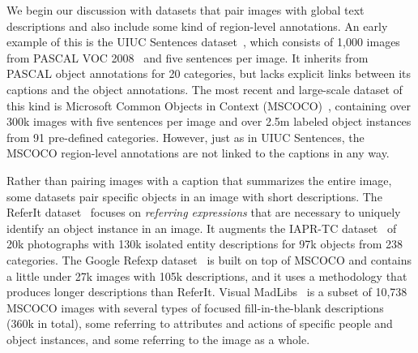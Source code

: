 \documentclass[twocolumn]{svjour3}
\begin{document}
We begin our discussion with datasets that pair images with global text descriptions and also include some kind of region-level annotations. An early example of this is the UIUC Sentences dataset~\citep{rashtchian2010collecting}, which consists of 1,000 images from PASCAL VOC 2008~\citep{pascal-voc-2008} and five sentences per image. It inherits from PASCAL object annotations for 20 categories, but lacks explicit links between its captions and the object annotations. The most recent and large-scale dataset of this kind is Microsoft Common Objects in Context (MSCOCO)~\citep{lin2014microsoft}, containing over 300k images with five sentences per image and over 2.5m labeled object instances from 91 pre-defined categories. However, just as in UIUC Sentences, the MSCOCO region-level annotations are not linked to the captions in any way.

Rather than pairing images with a caption that summarizes the entire image, some datasets pair specific objects in an image with short descriptions. The ReferIt dataset~\citep{kazemzadeh-EtAl:2014:EMNLP2014} focuses on {\em referring expressions} that are necessary to uniquely identify an object instance in an image. It augments the IAPR-TC dataset~\citep{grubinger2006iapr} of 20k photographs  with 130k isolated entity descriptions for 97k objects from 238 categories. The Google Refexp dataset~\citep{mao2015generation} is built on top of MSCOCO and contains a little under 27k images with 105k descriptions, and it uses a methodology that produces longer descriptions than ReferIt.
Visual MadLibs~\citep{VisualMadlibs} is a subset of 10,738 MSCOCO images with several types of focused fill-in-the-blank descriptions (360k in total), some referring to attributes and actions of specific people and object instances, and some referring to the image as a whole.
\end{document}
